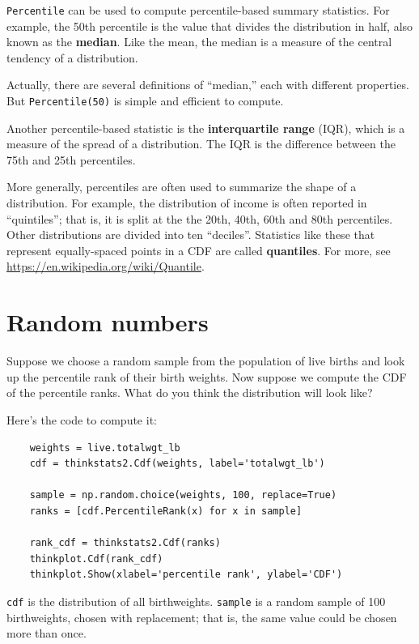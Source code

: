 \documentclass[12pt]{book}
\begin{document}
{\tt Percentile} can be used to compute percentile-based summary
statistics.  For example, the 50th percentile is the value that
divides the distribution in half, also known as the {\bf median}.
Like the mean, the median is a measure of the central tendency
of a distribution.

Actually, there are several definitions of ``median,'' each with
different properties.  But {\tt Percentile(50)} is simple and
efficient to compute.

Another percentile-based statistic is the {\bf interquartile range} (IQR),
which is a measure of the spread of a distribution.  The IQR
is the difference between the 75th and 25th percentiles.

More generally, percentiles are often used to summarize the shape
of a distribution.  For example, the distribution of income is
often reported in ``quintiles''; that is, it is split at the
the 20th, 40th, 60th and 80th percentiles.  Other distributions
are divided into ten ``deciles''.  Statistics like these that represent
equally-spaced points in a CDF are called {\bf quantiles}.
For more, see \url{https://en.wikipedia.org/wiki/Quantile}.


\section{Random numbers}
\label{random}

Suppose we choose a random sample from the population of live
births and look up the percentile rank of their birth weights.
Now suppose we compute the CDF of the percentile ranks.  What do
you think the distribution will look like?

Here's the code to compute it:

\begin{verbatim}
    weights = live.totalwgt_lb
    cdf = thinkstats2.Cdf(weights, label='totalwgt_lb')

    sample = np.random.choice(weights, 100, replace=True)
    ranks = [cdf.PercentileRank(x) for x in sample]

    rank_cdf = thinkstats2.Cdf(ranks)
    thinkplot.Cdf(rank_cdf)
    thinkplot.Show(xlabel='percentile rank', ylabel='CDF')
\end{verbatim}

{\tt cdf} is the distribution of all birthweights.  {\tt sample}
is a random sample of 100 birthweights, chosen with replacement;
that is, the same value could be chosen more than once.
\end{document}
